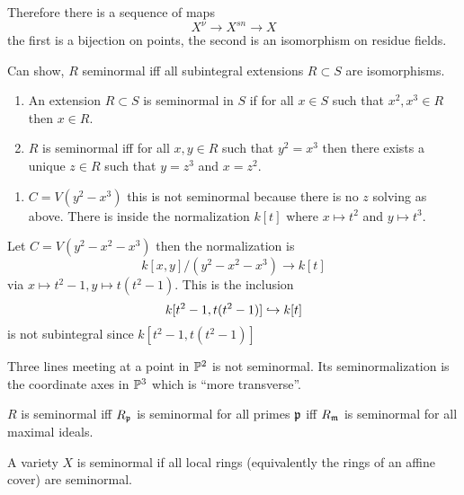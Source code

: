 \documentclass[12pt]{article}
\begin{document}
Therefore there is a sequence of maps
\[ X^{\nu} \to X^{sn} \to X \]
the first is a bijection on points, the second is an isomorphism on residue fields. 

\begin{rmk}
Can show, $R$ seminormal iff all subintegral extensions $R \subset S$ are isomorphisms.
\end{rmk}

\begin{theorem}[Swan]
\begin{enumerate}
\item An extension $R \subset S$ is seminormal in $S$ if for all $x \in S$ such that $x^2, x^3 \in R$ then $x \in R$.
\item $R$ is seminormal iff for all $x,y \in R$ such that $y^2 = x^3$ then there exists a unique $z \in R$ such that $y = z^3$ and $x = z^2$. 
\end{enumerate}
\end{theorem}

\begin{example}
\begin{enumerate}
\item $C = V(y^2 - x^3)$ this is not seminormal because there is no $z$ solving as above. There is inside the normalization $k[t]$ where $x \mapsto t^2$ and $y \mapsto t^3$.
\end{enumerate}
\end{example}

\begin{example}
Let $C = V(y^2 - x^2 - x^3)$ then the normalization is
\[ k[x,y]/(y^2 - x^2 - x^3) \to k[t] \]
via $x \mapsto t^2 - 1, y \mapsto t(t^2 - 1)$. This is the inclusion
\[ k[t^2-1,t(t^2-1)] \embed k[t] \]
is not subintegral since $k[t^2-1,t(t^2-1)]$ 
\end{example}

\begin{example}
Three lines meeting at a point in $\P^2$ is not seminormal. Its seminormalization is the coordinate axes in $\P^3$ which is ``more transverse''. 
\end{example}


\begin{lemma}
$R$ is seminormal iff $R_\p$ is seminormal for all primes $\p$ iff $R_{\m}$ is seminormal for all maximal ideals.
\end{lemma}

\begin{defn}
A variety $X$ is seminormal if all local rings (equivalently the rings of an affine cover) are seminormal.
\end{defn}
\end{document}
